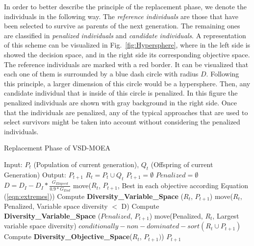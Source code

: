 In order to better describe the principle of the replacement phase, we denote the individuals in the following way.
%
The \textit{reference individuals} are those that have been selected to survive as parents of the next generation. 
%
The remaining ones are classified in \textit{penalized individuals} and \textit{candidate individuals}.
%
A representation of this scheme can be visualized in Fig.~\ref{fig:Hypersphere}, where in the left side is showed the decision space, and in the right side its corresponding objective space.
%
The reference individuals are marked with a red border.
%
It can be visualized that each one of them is surrounded by a blue dash circle with radius $D$.
%
Following this principle, a larger dimension of this circle would be a hypersphere.
%
Then, any candidate individual that is inside of this circle is penalized.
%
In this figure the penalized individuals are shown with gray background in the right side.
%
Once that the individuals are penalized, any of the typical approaches that are used to select survivors might be taken into account without considering the penalized individuals.


\begin{algorithm}[t]
  \scriptsize
	\caption{Replacement Phase of VSD-MOEA} 
\begin{algorithmic}[1]
\STATE Input: $P_t$ (Population of current generation), $Q_t$ (Offspring of current Generation)
    	\STATE Output: $P_{t+1}$ 
        \STATE $R_t = P_t \cup Q_t$ \label{alg:1}
        \STATE $P_{t+1} = \emptyset$ \label{alg:2}
        \STATE $Penalized = \emptyset$ \label{alg:3}
				\STATE $D = D_I - D_I * \frac{G_{Elapsed}}{0.9*G_{End}}$ \label{alg:4}
		\STATE move($R_t$,  $P_{t+1}$, Best in each objective according Equation (\ref{eqn:extremes})) \label{alg:5}
         \label{alg:6}
			\STATE Compute \textbf{Diversity\_Variable\_Space} ($R_t$, $P_{t+1}$) \label{alg:7}
		\STATE move($R_t$, Penalized, Variable space diversity $ < $ D)  \label{alg:8}
         \label{alg:9}
				\STATE Compute \textbf{Diversity\_Variable\_Space} ($Penalized$, $P_{t+1}$) \label{alg:10}
				\STATE move(Penalized, $R_t$, Largest variable space diversity) \label{alg:11}
        \ENDIF
		\STATE $conditionally-non-dominated-sort(R_t \cup P_{t+1}) $ \label{alg:12}
		\STATE Compute \textbf{Diversity\_Objective\_Space}($R_t$, $P_{t+1})$) \label{alg:13}
        \ENDWHILE
    	\RETURN $P_{t+1}$ \label{alg:14}
	\end{algorithmic}
\label{alg:Replacement_Phase}
\end{algorithm}


